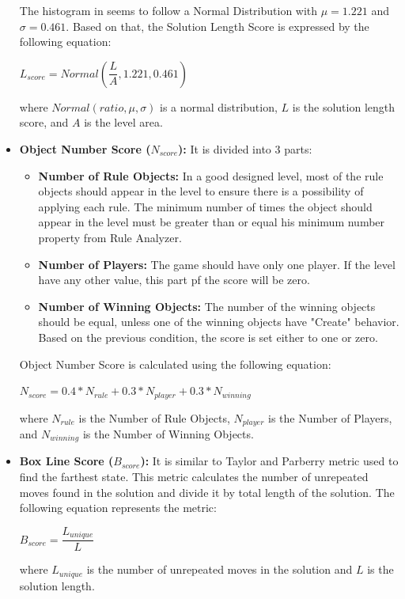 \begin{itemize}
	
	The histogram in  seems to follow a Normal Distribution with $\mu = 1.221$ and $\sigma = 0.461$. Based on that, the Solution Length Score is expressed by the following equation:
	\begin{center}$L_{score} = Normal(\dfrac{L}{A}, 1.221, 0.461)$\end{center}
	where $Normal(ratio, \mu, \sigma)$ is a normal distribution, $L$ is the solution length score, and $A$ is the level area.
	
	\item \textbf{Object Number Score ($N_{score}$):} It is divided into 3 parts:
	\begin{itemize} \itemsep0pt \parskip0pt 
		\item \textbf{Number of Rule Objects:} In a good designed level, most of the rule objects should appear in the level to ensure there is a possibility of applying each rule. The minimum number of times the object should appear in the level must be greater than or equal his minimum number property from Rule Analyzer.
		\item \textbf{Number of Players:} The game should have only one player. If the level have any other value, this part pf the score will be zero.
		\item \textbf{Number of Winning Objects:} The number of the winning objects should be equal, unless one of the winning objects have "Create" behavior. Based on the previous condition, the score is set either to one or zero.
	\end{itemize}
	Object Number Score is calculated using the following equation:
	\begin{center}$N_{score} = 0.4 * N_{rule} + 0.3 * N_{player} + 0.3 * N_{winning}$\end{center}
	where $N_{rule}$ is the Number of Rule Objects, $N_{player}$ is the Number of Players, and $N_{winning}$ is the Number of Winning Objects.
	
	\item \textbf{Box Line Score ($B_{score}$):} It is similar to Taylor and Parberry\cite{sokobanLevelGenerationNew} metric used to find the farthest state. This metric calculates the number of unrepeated moves found in the solution and divide it by total length of the solution. The following equation represents the metric:
	\begin{center}$B_{score} = \dfrac{L_{unique}}{L}$\end{center}
	where $L_{unique}$ is the number of unrepeated moves in the solution and $L$ is the solution length.
	

\end{itemize}
